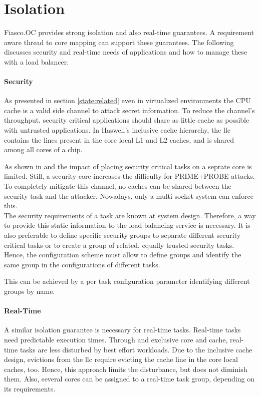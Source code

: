 \section{Isolation}
\label{design:isolation}

Fiasco.OC provides strong isolation and also real-time guarantees.
A requirement aware thread to core mapping can support these guarantees.
The following discusses security and real-time needs of applications and how to
manage these with a load balancer.

\paragraph{Security}
As presented in section \ref{state:related} even in virtualized environments
the CPU cache is a valid side channel to attack secret information.
To reduce the channel's throughput, security critical applications should share
as little cache as possible with untrusted applications.
In Haswell's inclusive cache hierarchy, the \gls{llc} contains the lines
present in the core local L1 and L2 caches, and is shared among all cores of a
chip.

As shown in \cite{inci_seriously_2015} and \cite{liu_last-level_2015}
the impact of placing security critical tasks on a seprate core is limited.
Still, a security core increases the difficulty for PRIME+PROBE attacks.
To completely mitigate this channel, no caches can be shared between the
security task and the attacker.
Nowadays, only a multi-socket system can enforce this.
\\

The security requirements of a task are known at system design.
Therefore, a way to provide this static information to the load balancing
service is necessary.
It is also preferable to define specific security groups to separate different
security critical tasks or to create a group of related, equally trusted
security tasks.
Hence, the configuration scheme must allow to define groups and identify the
same group in the configurations of different tasks.

This can be achieved by a per task configuration parameter identifying
different groups by name.


\paragraph{Real-Time}
A similar isolation guarantee is necessary for real-time tasks.
Real-time tasks need predictable execution times.
Through and exclusive core and cache, real-time tasks are less disturbed by best
effort workloads.
Due to the inclusive cache design, evictions from the \gls{llc} require
evicting the cache line in the core local caches, too.
Hence, this approach limits the disturbance, but does not diminish them.
Also, several cores can be assigned to a real-time task group, depending on its
requirements.

